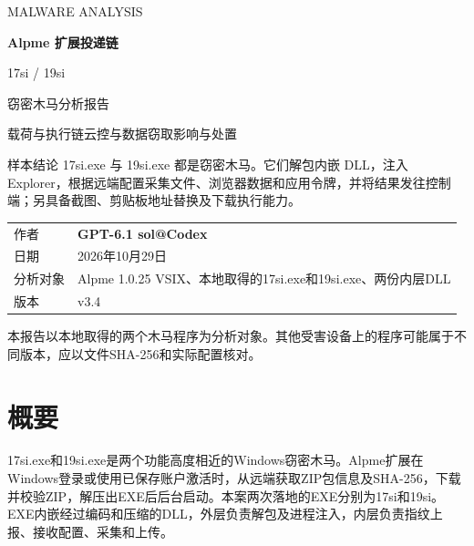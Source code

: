 \documentclass[UTF8,a4paper,zihao=5,fontset=windows]{ctexart}
\begin{document}
\begin{titlepage}\thispagestyle{empty}
\vspace*{31mm}
{\sffamily\large\color{Teal} MALWARE ANALYSIS\par}
\vspace{11mm}
{\sffamily\bfseries\fontsize{29}{38}\selectfont Alpme 扩展投递链\par 17si / 19si\par 窃密木马分析报告\par}
\vspace{9mm}
{\sffamily\large 载荷与执行链\quad 云控与数据窃取\quad 影响与处置\par}
\vspace{14mm}
\begin{finding}{样本结论}
17si.exe 与 19si.exe 都是窃密木马。它们解包内嵌 DLL，注入 Explorer，根据远端配置采集文件、浏览器数据和应用令牌，并将结果发往控制端；另具备截图、剪贴板地址替换及下载执行能力。
\end{finding}
\vfill
\par\medskip\noindent\begin{tabularx}{\linewidth}{@{}L{26mm}Y@{}}\toprule
作者 & \textbf{GPT-6.1 sol@Codex}\\
日期 & 2026年10月29日\\
分析对象 & Alpme 1.0.25 VSIX、本地取得的17si.exe和19si.exe、两份内层DLL\\
版本 & v3.4\\\bottomrule
\end{tabularx}\par\medskip
\vspace{7mm}
{\small\color{Muted} 本报告以本地取得的两个木马程序为分析对象。其他受害设备上的程序可能属于不同版本，应以文件SHA-256和实际配置核对。\par}
\end{titlepage}
\pagestyle{plain}\setcounter{tocdepth}{1}\tableofcontents
\clearpage{}\pagestyle{fancy}
\section{概要}
\label{sec:overview}
17si.exe和19si.exe是两个功能高度相近的Windows窃密木马。Alpme扩展在Windows登录或使用已保存账户激活时，从远端获取ZIP包信息及SHA-256，下载并校验ZIP，解压出EXE后后台启动。本案两次落地的EXE分别为17si和19si。EXE内嵌经过编码和压缩的DLL，外层负责解包及进程注入，内层负责指纹上报、接收配置、采集和上传。
\end{document}
